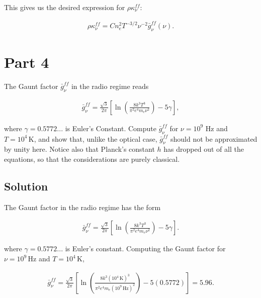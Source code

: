 \documentclass[12pt]{article}
\begin{document}
{\noindent}This gives us the desired expression for $\rho\kappa_\nu^{ff}$:

\begin{align*}
\boxed{\rho\kappa_\nu^{ff} = C n_e^2 T^{-3/2} \nu^{-2}\bar{g}_\nu^{ff}(\nu)}.
\end{align*}


\section*{Part 4}

The Gaunt factor $\bar{g}_\nu^{ff}$ in the radio regime reads

\begin{align*}
\bar{g}_\nu^{ff} = \frac{\sqrt3}{2\pi}\left[\ln\left(\frac{8k^3T^3}{\pi^2e^4m_e\nu^2}\right)-5\gamma\right],
\end{align*}

{\noindent}where $\gamma = 0.5772...$ is Euler's Constant. Compute $\bar{g}_\nu^{ff}$ for $\nu = 10^9$ Hz and $T = 10^4\,\mathrm{K}$, and show that, unlike the optical case, $\bar{g}_\nu^{ff}$ should not be approximated by unity here. Notice also that Planck's constant $h$ has dropped out of all the equations, so that the considerations are purely classical.


\subsection*{Solution}

The Gaunt factor in the radio regime has the form

\begin{align*}
    \bar{g}_\nu^{ff} = \frac{\sqrt3}{2\pi}\left[\ln\left(\frac{8k^3T^3}{\pi^2e^4m_e\nu^2}\right)-5\gamma\right].
\end{align*}

{\noindent}where $\gamma=0.5772...$ is Euler's constant. Computing the Gaunt factor for $\nu=10^9\,\mathrm{Hz}$ and $T=10^4\,\mathrm{K}$,

\begin{align*}
    \bar{g}_\nu^{ff} = \frac{\sqrt3}{2\pi}\left[\ln\left(\frac{8k^3(10^4\,\mathrm{K})^3}{\pi^2e^4m_e(10^9\,\mathrm{Hz})^2}\right)-5(0.5772)\right] = 5.96.
\end{align*}
\end{document}
